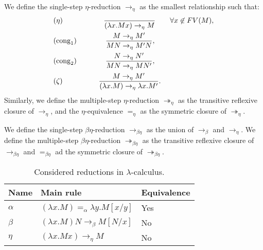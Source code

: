 \begin{definition}
  We define the single-step $\eta$-reduction $\to_\eta$ as the smallest relationship such that: 
  \begin{align*}
    &(\eta) \qquad\qquad \ \ \ \  \ {\ \over(\lambda x.Mx) \to_\eta M} \qquad \forall x \not  \in FV(M),\\
    &(\operatorname{cong}_1)\qquad\qquad{ M \to_\eta M' \over MN \to_\eta M'N },\\
    &(\operatorname{cong}_2)\qquad\qquad{ N \to_\eta N' \over MN \to_\eta MN' },\\
    &(\zeta) \qquad\qquad \ \  \ {M\to_\eta M' \over(\lambda x.M) \to_\eta \lambda x.M'}.\\
  \end{align*}
  Similarly, we define the multiple-step $\eta$-reduction $\twoheadrightarrow_\eta$ as the transitive reflexive closure of $\to_\eta$, and the $\eta$-equivalence $=_\eta$ as the symmetric closure of $\twoheadrightarrow_\eta$.
\end{definition}
\begin{definition}
  We define the single-step $\beta\eta$-reduction $\to_{\beta\eta}$ as the union of $\to_\beta$ and $\to_\eta$.  We define the multiple-step $\beta\eta$-reduction $\twoheadrightarrow_{\beta\eta}$ as the transitive reflexive closure of $\to_{\beta\eta}$ and $=_{\beta\eta}$ ad the symmetric closure of $\twoheadrightarrow_{\beta\eta}$.
\end{definition}




\begin{table}[h]
  \begin{center}
    \begin{tabular}{|l|l|l|}
      \hline
      Name & Main rule & Equivalence \\
      \hline
      $\alpha$ & $ (\lambda x. M) =_\alpha \lambda y. M[x/y]$& Yes\\
      $\beta$ & $(\lambda x.M)N \to_\beta M[N/x]$& No\\
      $\eta$ & ${\displaystyle (\lambda x.Mx) \to_\eta M }$& No\\
      \hline
    \end{tabular}
  \end{center}
  \caption{\label{tab:reductions}Considered reductions in $\lambda$-calculus.}
\end{table}


